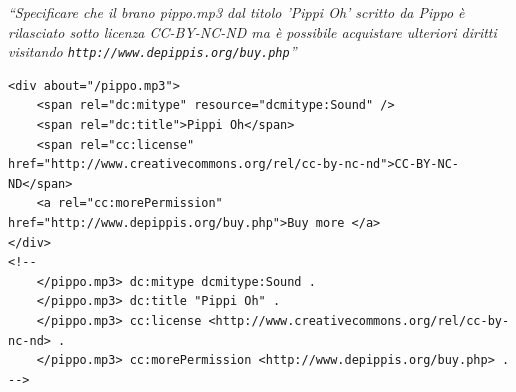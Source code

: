 \begin{center}
	\textit{``Specificare che il brano pippo.mp3 dal titolo 'Pippi Oh' scritto da Pippo è rilasciato sotto licenza CC-BY-NC-ND ma è possibile acquistare ulteriori diritti visitando \texttt{http://www.depippis.org/buy.php}''}
\end{center}

\begin{lstlisting}[language=RDFA]
<div about="/pippo.mp3">
	<span rel="dc:mitype" resource="dcmitype:Sound" />
	<span rel="dc:title">Pippi Oh</span>
	<span rel="cc:license" href="http://www.creativecommons.org/rel/cc-by-nc-nd">CC-BY-NC-ND</span>
	<a rel="cc:morePermission" href="http://www.depippis.org/buy.php">Buy more </a>
</div>
<!--
	</pippo.mp3> dc:mitype dcmitype:Sound .
	</pippo.mp3> dc:title "Pippi Oh" .
	</pippo.mp3> cc:license <http://www.creativecommons.org/rel/cc-by-nc-nd> .
	</pippo.mp3> cc:morePermission <http://www.depippis.org/buy.php> .
-->
\end{lstlisting}
